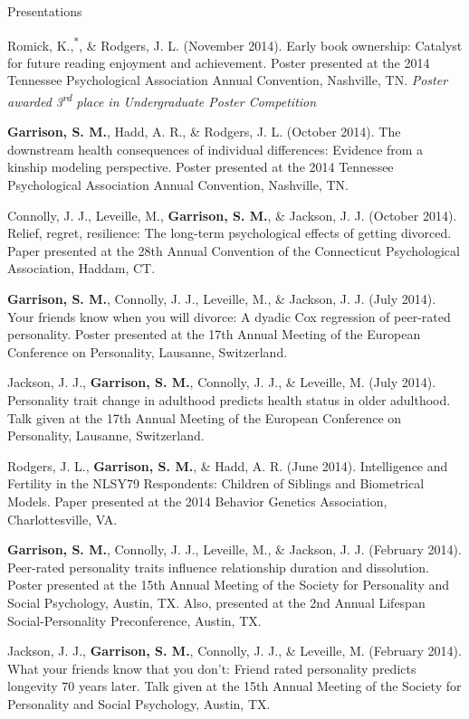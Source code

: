 \documentclass {resume}
\newlength{\wideitemsep}
\let\olditem\item
\renewcommand{\item}{\setlength{\itemsep}{\wideitemsep}\olditem}
\newcommand{\meb}{{\bf Garrison, S. M.}\xspace}
\newcommand{\student}{\hspace{-3.95pt}\textsuperscript{*}\hspace* {2 pt}}
\begin{document}
\begin{rSection}{\textrm{Presentations}}
\begin{etaremune}
\item Romick, K.,\student \meb, \& Rodgers, J. L. (November 2014). Early book ownership: Catalyst for future reading enjoyment and achievement. Poster presented at the 2014 Tennessee Psychological Association Annual Convention, Nashville, TN. \textit{Poster awarded 3\textsuperscript{rd} place in Undergraduate Poster Competition}
\item\meb, Hadd, A. R., \& Rodgers, J. L. (October 2014). The downstream health consequences of individual differences: Evidence from a kinship modeling perspective. Poster presented at the 2014 Tennessee Psychological Association Annual Convention, Nashville, TN.
\item Connolly, J. J., Leveille, M., \meb, \& Jackson, J. J. (October 2014). Relief,  regret,  resilience: The  long-term  psychological  effects  of  getting divorced. Paper presented at the 28th Annual Convention of the Connecticut Psychological Association, Haddam, CT.
\item\meb, Connolly, J. J., Leveille, M., \& Jackson, J. J. (July 2014). Your friends know when you will divorce: A dyadic Cox regression of peer-rated personality. Poster presented at the 17th Annual Meeting of the European Conference on Personality, Lausanne, Switzerland.
\item Jackson, J. J., \meb, Connolly, J. J., \& Leveille, M. (July 2014). Personality trait change in adulthood predicts health status in older adulthood. Talk given at the 17th Annual Meeting of the European Conference on Personality, Lausanne, Switzerland.
\item Rodgers, J. L., \meb, \& Hadd, A. R. (June 2014). Intelligence and Fertility in the NLSY79 Respondents: Children of Siblings and Biometrical Models. Paper presented at the 2014 Behavior Genetics Association, Charlottesville, VA. 
\pagestyle{myheadings}
\item\meb, Connolly, J. J., Leveille, M., \& Jackson, J. J. (February 2014). Peer-rated personality traits influence relationship duration and dissolution. Poster presented at the 15th Annual Meeting of the Society for Personality and Social Psychology, Austin, TX. Also, presented at the 2nd Annual Lifespan Social-Personality  Preconference, Austin, TX.
\item Jackson, J. J., \textbf{Garrison, S. M.}, Connolly, J. J., \& Leveille, M. (February 2014). What your friends know that you don't: Friend rated personality predicts longevity 70 years later. Talk given at the 15th Annual Meeting of the Society for Personality and  Social Psychology, Austin, TX.


\end{etaremune}
\end{rSection}
\end{document}
